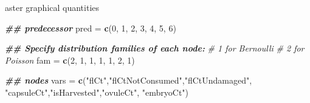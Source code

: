 \documentclass[
  ignorenonframetext,
]{beamer}
\newenvironment{Shaded}{\begin{snugshade}}{\end{snugshade}}
\newcommand{\CommentTok}[1]{\textcolor[rgb]{0.56,0.35,0.01}{\textit{#1}}}
\newcommand{\DecValTok}[1]{\textcolor[rgb]{0.00,0.00,0.81}{#1}}
\newcommand{\DocumentationTok}[1]{\textcolor[rgb]{0.56,0.35,0.01}{\textbf{\textit{#1}}}}
\newcommand{\FunctionTok}[1]{\textcolor[rgb]{0.13,0.29,0.53}{\textbf{#1}}}
\newcommand{\NormalTok}[1]{#1}
\newcommand{\OtherTok}[1]{\textcolor[rgb]{0.56,0.35,0.01}{#1}}
\newcommand{\StringTok}[1]{\textcolor[rgb]{0.31,0.60,0.02}{#1}}
\begin{document}
\begin{frame}[fragile]{aster graphical quantities}
\protect\hypertarget{aster-graphical-quantities}{}
\begin{Shaded}
\begin{Highlighting}[]
\DocumentationTok{\#\# predecessor}
\NormalTok{pred }\OtherTok{=} \FunctionTok{c}\NormalTok{(}\DecValTok{0}\NormalTok{, }\DecValTok{1}\NormalTok{, }\DecValTok{2}\NormalTok{, }\DecValTok{3}\NormalTok{, }\DecValTok{4}\NormalTok{, }\DecValTok{5}\NormalTok{, }\DecValTok{6}\NormalTok{)}

\DocumentationTok{\#\# Specify distribution families of each node: }
\CommentTok{\# 1 for Bernoulli}
\CommentTok{\# 2 for Poisson }
\NormalTok{fam }\OtherTok{=} \FunctionTok{c}\NormalTok{(}\DecValTok{2}\NormalTok{, }\DecValTok{1}\NormalTok{, }\DecValTok{1}\NormalTok{, }\DecValTok{1}\NormalTok{, }\DecValTok{1}\NormalTok{, }\DecValTok{2}\NormalTok{, }\DecValTok{1}\NormalTok{)}

\DocumentationTok{\#\# nodes}
\NormalTok{vars }\OtherTok{=} \FunctionTok{c}\NormalTok{(}\StringTok{"flCt"}\NormalTok{,}\StringTok{"flCtNotConsumed"}\NormalTok{,}\StringTok{"flCtUndamaged"}\NormalTok{,}
         \StringTok{"capsuleCt"}\NormalTok{,}\StringTok{"isHarvested"}\NormalTok{,}\StringTok{"ovuleCt"}\NormalTok{,}
         \StringTok{"embryoCt"}\NormalTok{)}
\end{Highlighting}
\end{Shaded}
\end{frame}
\end{document}

